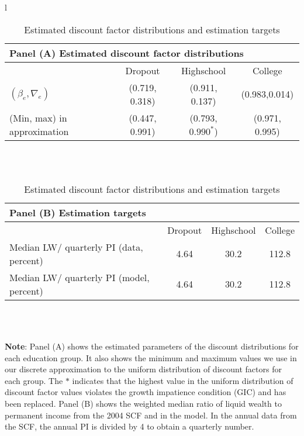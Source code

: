 \documentclass[\econtexRoot/HAFiscal]{subfiles}
\begin{document}
\begin{table}[th]
  \begin{center}
    \begin{tabular}{l}
      \begin{tabular}{lccc}
        \multicolumn{4}{l}{Panel (A) Estimated discount factor distributions} \\ \midrule
        & Dropout & Highschool & College \\ \midrule
        $(\beta_e, \nabla_e)$ & (0.719, 0.318) & (0.911, 0.137) & (0.983,0.014) \\
        (Min, max) in approximation & (0.447, 0.991) & (0.793, $0.990^*$) & (0.971, 0.995) \\
        \midrule 
      \end{tabular} \\ \\ 
      
      \begin{tabular}{lccc}
        \multicolumn{4}{l}{Panel (B) Estimation targets} \\ \midrule
        & Dropout & Highschool & College \\ \midrule
        Median LW/ quarterly PI (data, percent) & 4.64 & 30.2 & 112.8 \\ 
        Median LW/ quarterly PI (model, percent) & 4.64 & 30.2 & 112.8 %
        \\ \midrule 
      \end{tabular} \\ \\ 
    \end{tabular}
    \caption{Estimated discount factor distributions and estimation targets}
    \notinsubfile{\label{tab:estimBetas}}
    \parbox{16cm}{\small \vspace{.15cm} \textbf{Note}: Panel (A) shows the estimated parameters of the discount distributions for each education group.
It also shows the minimum and maximum values we use in our discrete approximation to the uniform distribution of discount factors for each group.
The $*$ indicates that the highest value in the uniform distribution of discount factor values violates the growth impatience condition (GIC) and has been replaced.
Panel (B) shows the weighted median ratio of liquid wealth to permanent income from the 2004 SCF and in the model.
In the annual data from the SCF, the annual PI is divided by 4 to obtain a quarterly number.\normalsize}
  \end{center}
\end{table}
\end{document}
